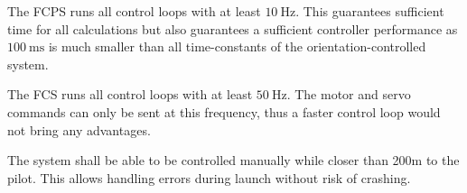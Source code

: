 {The FCPS runs all control loops with at least $\SI{10}{\hertz}$.}
{
			This guarantees sufficient time for all calculations but also guarantees a sufficient 
			controller performance as $\SI{100}{\milli\second}$ is much smaller than all time-constants 
			of the orientation-controlled system.
		}

{The FCS runs all control loops with at least $\SI{50}{\hertz}$.}
{
			The motor and servo commands can only be sent at this frequency, 
			thus a faster control loop would not bring any advantages.
		}

{The system shall be able to be controlled manually while closer than 200m to the pilot.}
{This allows handling errors during launch without risk of crashing.}

